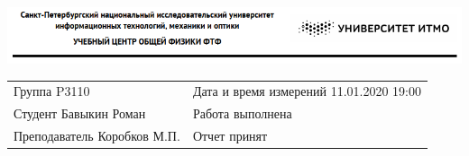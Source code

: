 \documentclass[12pt, a4paper]{article}
\begin{document}
\thispagestyle{empty}
\includegraphics[scale=0.75]{itmo.png}

\begin{tabular}{l l}
	Группа P3110 & \hspace{1.5cm}Дата и время измерений 11.01.2020 19:00\\
	Студент Бавыкин Роман & \hspace{1.5cm}Работа выполнена\\
	Преподаватель Коробков М.П. & \hspace{1.5cm}Отчет принят
\end{tabular}
\end{document}
